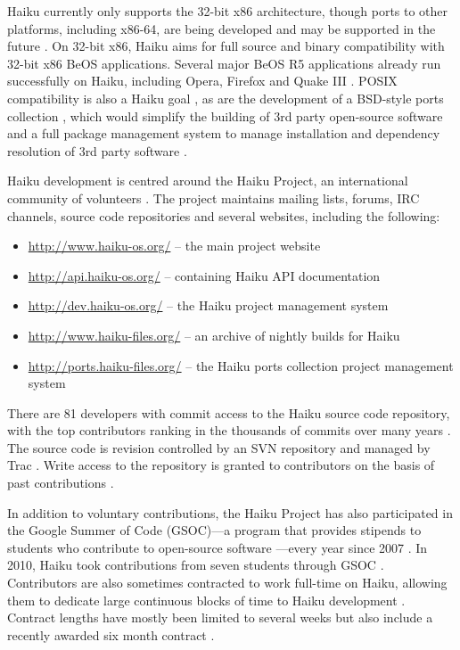 \documentclass{article}
\begin{document}
Haiku currently only supports the 32-bit x86 architecture, though
ports to other platforms, including x86-64, are being developed and
may be supported in the future \cite{HaikuFaq}.  On 32-bit x86, Haiku
aims for full source and binary compatibility with 32-bit x86 BeOS
applications.  Several major BeOS R5 applications already run
successfully on Haiku, including Opera, Firefox and Quake III
\cite{HaikuWiki}.  POSIX compatibility is also a Haiku goal
\cite{HaikuFuture, HaikuIncContracts}, as are the development of a
BSD-style ports collection \cite{HaikuPorts}, which would simplify the
building of 3rd party open-source software and a full package
management system to manage installation and dependency resolution of
3rd party software \cite{HaikuR1A3Notes}.

Haiku development is centred around the Haiku Project, an
international community of volunteers \cite{HaikuAbout}.  The project
maintains mailing lists, forums, IRC channels, \cite{HaikuComm} source
code repositories \cite{HaikuGetSvn} and several websites, including
the following:
\begin{itemize}
  \item \url{http://www.haiku-os.org/} -- the main project website
  \item \url{http://api.haiku-os.org/} -- containing Haiku API documentation
  \item \url{http://dev.haiku-os.org/} -- the Haiku project management
    system
  \item \url{http://www.haiku-files.org/} -- an archive of nightly
    builds for Haiku
  \item \url{http://ports.haiku-files.org/} -- the Haiku ports collection
    project management system
\end{itemize}

There are 81 developers with commit access to the Haiku source code
repository, with the top contributors ranking in the thousands of
commits over many years \cite{HaikuContrib}.  The source code is
revision controlled by an SVN repository and managed by Trac
\cite{HaikuDevStart}.  Write access to the repository is granted to
contributors on the basis of past contributions \cite{HaikuDevStart}.

In addition to voluntary contributions, the Haiku Project has also
participated in the Google Summer of Code (GSOC)---a program that
provides stipends to students who contribute to open-source software
\cite{GSOCWiki}---every year since 2007 \cite{HaikuGSOC}.  In 2010,
Haiku took contributions from seven students through GSOC
\cite{HaikuGSOC2010}.  Contributors are also sometimes contracted to
work full-time on Haiku, allowing them to dedicate large continuous
blocks of time to Haiku development \cite{HaikuIncContracts}.
Contract lengths have mostly been limited to several weeks but also
include a recently awarded six month contract
\cite{HaikuLongContract}.
\end{document}
